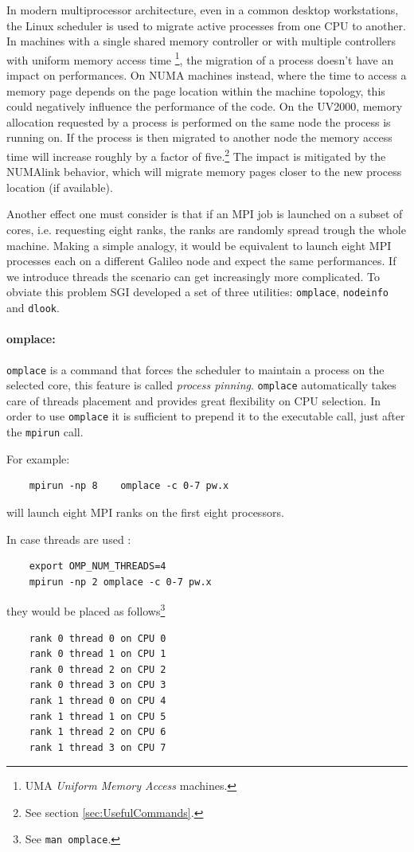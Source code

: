 \documentclass[a4paper,12pt]{article}
\begin{document}
In modern multiprocessor architecture, even in a common desktop workstations, the Linux scheduler is used to migrate active processes from one CPU to another. 
In machines with a single shared memory controller  or with multiple controllers with uniform memory access time \footnote{UMA \textit{Uniform Memory Access} machines.}, the migration of a process doesn't have an impact on performances.
On NUMA machines instead, where the time to access a memory page depends on the page location within the machine topology, this could negatively influence the performance of the code.
On the UV2000, memory allocation requested by a process is performed on the same node the process is running on. 
If the process is then migrated to another node the memory access time will increase roughly by a factor of five.\footnote{See section \ref{sec:UsefulCommands}.}
The impact is mitigated by the NUMAlink behavior, which will migrate memory pages closer to the new process location (if available).

Another effect one must consider is that if an MPI job is launched on a subset of cores, i.e. requesting eight ranks, the ranks are randomly spread trough the whole machine.
Making a simple analogy, it would be equivalent to launch eight MPI processes each on a different Galileo node and expect the same performances.
If we introduce threads the scenario can get increasingly more complicated.
To obviate this problem SGI developed a set of three utilities: \texttt{omplace}, \texttt{nodeinfo} and \texttt{dlook}.

\paragraph{omplace:} \texttt{omplace} is a command that forces the scheduler to maintain a process on the selected core, this feature is called \textit{process pinning}. 
\texttt{omplace} automatically takes care of threads placement and provides great flexibility on CPU selection.
In order to use \texttt{omplace} it is sufficient to prepend it to the executable call, just after the \texttt{mpirun} call.

For example:
\begin{verbatim}
	mpirun -np 8 	omplace -c 0-7 pw.x
\end{verbatim}
will launch eight MPI ranks on the first eight processors.

In case threads are used :
\begin{verbatim}
	export OMP_NUM_THREADS=4
	mpirun -np 2 omplace -c 0-7 pw.x	
\end{verbatim}
they would be placed as follows\footnote{See \texttt{man omplace}.}
\begin{verbatim}
    rank 0 thread 0 on CPU 0
    rank 0 thread 1 on CPU 1
    rank 0 thread 2 on CPU 2
    rank 0 thread 3 on CPU 3
    rank 1 thread 0 on CPU 4
    rank 1 thread 1 on CPU 5
    rank 1 thread 2 on CPU 6
    rank 1 thread 3 on CPU 7
\end{verbatim}
\end{document}
